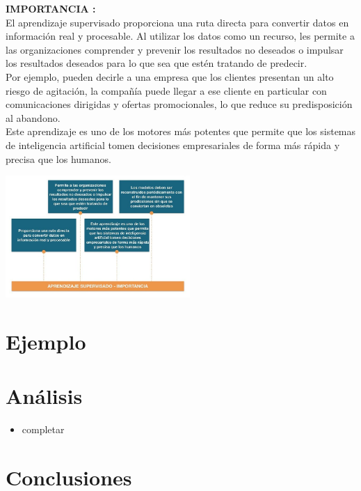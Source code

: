 \documentclass[%
 reprint,
 amsmath,amssymb,
 aps,
]{revtex4-1}
\begin{document}
    \textbf{IMPORTANCIA :} \\
    El aprendizaje supervisado proporciona una ruta directa para convertir datos en información real y procesable. Al utilizar los datos como un recurso, les permite a las organizaciones comprender y prevenir los resultados no deseados o impulsar los resultados deseados para lo que sea que estén tratando de predecir.\\
    Por ejemplo, pueden decirle a una empresa que los clientes presentan un alto riesgo de agitación, la compañía puede llegar a ese cliente en particular con comunicaciones dirigidas y ofertas promocionales, lo que reduce su predisposición al abandono.\\
    Este aprendizaje es uno de los motores más potentes que permite que los sistemas de inteligencia artificial tomen decisiones empresariales de forma más rápida y precisa que los humanos.

 \begin{center}
\includegraphics[width=7cm]{./Imagenes/importancia}
\end{center}



\section{Ejemplo}

\section{Análisis}

\begin{itemize}
\item
completar

\end{itemize}
\section{Conclusiones}
\end{document}
